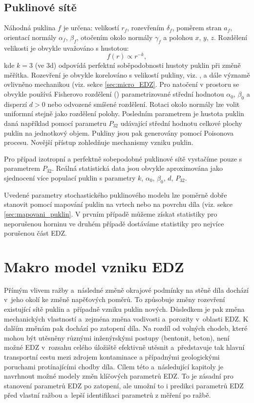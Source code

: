 \documentclass{article}
\begin{document}
\subsection{Puklinové sítě}
Náhodná puklina $f$ je určena: velikostí $r_f$, rozevřením $\delta_f$, poměrem stran $a_f$, orientací normály $\alpha_f$, $\beta_f$, otočením okolo normály $\gamma_f$ a polohou $x$, $y$, $z$. Rozdělení velikosti je obvykle uvažováno s hustotou:
\[
   f(r) \propto r^{-k},
\]
kde $k = 3$ (ve 3d) odpovídá perfektní soběpodobnosti hustoty puklin při změně měřítka. Rozevření je obvykle korelováno s velikostí pukliny, viz. \cite{Olson2003},
a dále významě ovlivněno mechanikou (viz. sekce \ref{sec:micro_EDZ}. Pro natočení v prostoru se obvykle používá Fisherovo rozdělení (\cite{Fisher1993}) parametrizované střední hodnotou $\alpha_0$, $\beta_0$ a disperzí $d>0$ nebo odvozené smíšené rozdělení. 
Rotaci okolo normály lze volit uniformní stejně jako rozdělení polohy. Posledním parametrem je hustota puklin daná například pomocí parametru  $P_{32}$
udávající střední hodnotu celkové plochy puklin na jednotkový objem. Pukliny jsou pak generovány pomocí Poisonova procesu. Novější přístup
 \cite{Maillot2014} zohledňuje mechanismy vzniku puklin.

Pro případ izotropní a perfektně sobepodobné puklinové sítě vystačíme pouze s parametrem $P_{32}$. Reálná statistická data jsou obvykle aproximována jako sjednocení více populací puklin s parametry 
$k$, $\alpha_0$, $\beta_0$, $d$, $P_{32}$.

Uvedené parametry stochastického puklinového modelu lze poměrně dobře stanovit pomocí mapování puklin na vrtech nebo na povrchu díla (viz. sekce \ref{sec:mapovani_puklin}. 
V prvním případě můžeme získat statistiky pro neporušenou horninu ve druhém případě dostáváme statistiky pro nejvíce porušenou část EDZ.

\section{Makro model vzniku EDZ}
\label{sec:model_EDZ}

Přímým vlivem ražby a~následné změně okrajové podmínky na stěně díla dochází v~jeho okolí ke změně napěťových poměrů. To způsobuje změny rozevření 
existující sítě puklin a~případně vzniku puklin nových. Důsledkem je pak změna mechanických vlastností a~zejména změna vodivosti
a~porozity v~oblasti EDZ. K dalším změnám pak dochází po zatopení díla. Na rozdíl od volných chodeb, které mohou být utěsněny různými inženýrskými postupy (bentonit, beton), není možné EDZ v~rozsahu celého úložiště efektivně utěsnit a~představuje tak hlavní transportní cestu mezi zdrojem kontaminace 
a případnými geologickými poruchami protínajícími chodby díla. 
Cílem této a~následující kapitoly je navrhnout možné modely změn klíčových parametrů EDZ. To je zásadní pro stanovení parametrů EDZ po zatopení, ale
umožní to i predikci parametrů EDZ před vlastní ražbou a~lepší identifikaci parametrů z měření po ražbě.
\end{document}
